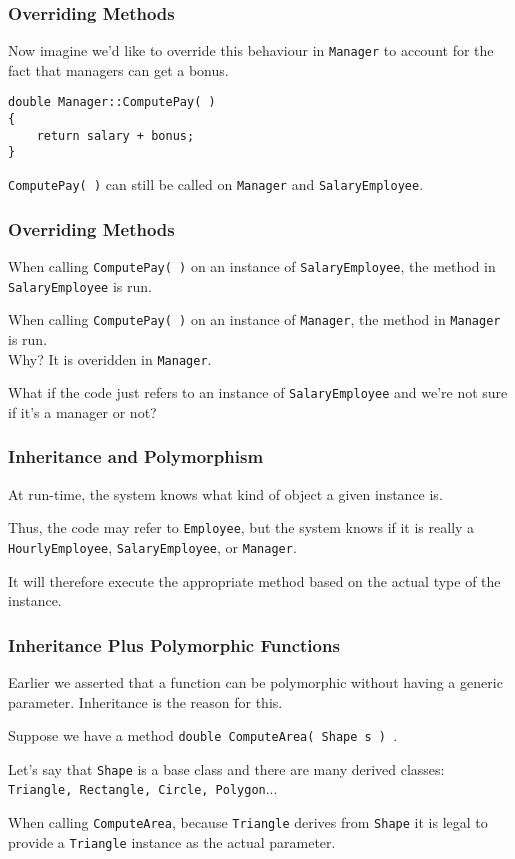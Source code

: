 \begin{frame}[fragile]
\frametitle{Overriding Methods}
Now imagine we'd like to override this behaviour in \texttt{Manager} to account for the fact that managers can get a bonus.

\begin{verbatim}
double Manager::ComputePay( )
{
    return salary + bonus;
}
\end{verbatim}

\texttt{ComputePay( )} can still be called on \texttt{Manager} and \texttt{SalaryEmployee}.

\end{frame}

\begin{frame}
\frametitle{Overriding Methods}

When calling \texttt{ComputePay( )} on an instance of \texttt{SalaryEmployee}, the method in \texttt{SalaryEmployee} is run.

When calling \texttt{ComputePay( )} on an instance of \texttt{Manager}, the method in \texttt{Manager} is run.\\
\quad Why? It is overidden in \texttt{Manager}.

What if the code just refers to an instance of \texttt{SalaryEmployee} and we're not sure if it's a manager or not?

\end{frame}

\begin{frame}
\frametitle{Inheritance and Polymorphism}

At run-time, the system knows what kind of object a given instance is.

Thus, the code may refer to \texttt{Employee}, but the system knows if it is really a \texttt{HourlyEmployee}, \texttt{SalaryEmployee}, or \texttt{Manager}.

It will therefore execute the appropriate method based on the actual type of the instance.

\end{frame}



\begin{frame}
\frametitle{Inheritance Plus Polymorphic Functions}
Earlier we asserted that a function can be polymorphic without having a generic parameter. Inheritance is the reason for this.

Suppose we have a method \texttt{double ComputeArea( Shape s ) }.

Let's say that \texttt{Shape} is a base class and there are many derived classes: \texttt{Triangle, Rectangle, Circle, Polygon}...

When calling \texttt{ComputeArea}, because \texttt{Triangle} derives from \texttt{Shape} it is legal to provide a \texttt{Triangle} instance as the actual parameter.

\end{frame}




